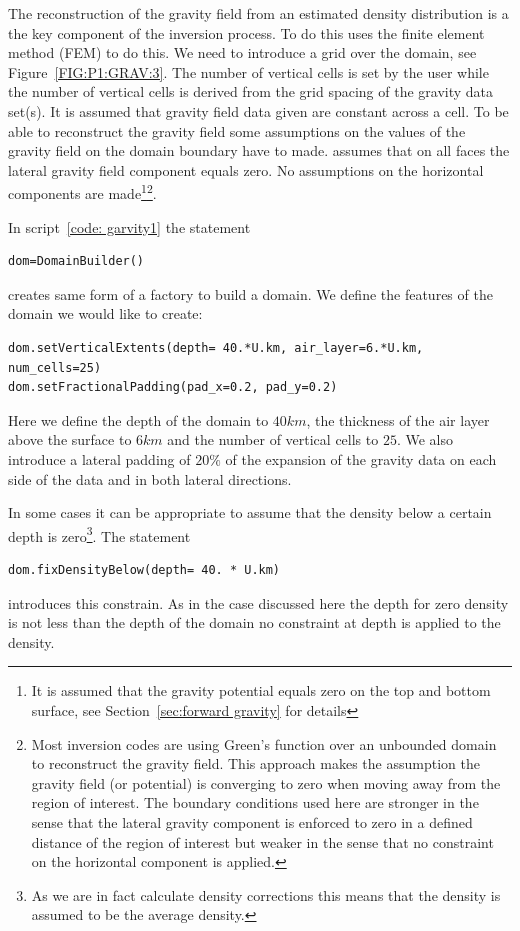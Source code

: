 The reconstruction of the gravity field from an estimated density distribution is a the key component of the inversion process.
To do this \downunder uses the finite element method (FEM) to do this. We need to introduce a grid over the domain, see Figure~\ref{FIG:P1:GRAV:3}.
The number of vertical cells is set by the user while the number of vertical cells is derived from the grid spacing of the 
gravity data set(s). It is assumed that gravity field data given are constant across a cell. 
To be able to reconstruct the gravity field some assumptions on the values of the gravity field on the domain boundary
have to made. \downunder assumes that on all faces the lateral gravity field component equals 
zero. No assumptions on the 
horizontal components are made\footnote{It is assumed that the gravity potential equals zero on the top and bottom
surface, see Section~\ref{sec:forward gravity} for details}\footnote{Most inversion codes are using Green's function over an unbounded domain to reconstruct the gravity field. This approach
makes the assumption the gravity field (or potential) is converging to zero when moving away from the region of interest. The 
boundary conditions used here are stronger in the sense that the lateral gravity component is enforced to zero in 
a defined distance of the region of interest but weaker in the sense that no constraint on the horizontal component is applied.}.
   
In script~\ref{code: garvity1} the statement
\begin{verbatim}
dom=DomainBuilder()
\end{verbatim}
creates same form of a factory to build a domain. 
We define the features of the domain we would like to create:
\begin{verbatim}
dom.setVerticalExtents(depth= 40.*U.km, air_layer=6.*U.km, num_cells=25)
dom.setFractionalPadding(pad_x=0.2, pad_y=0.2)
\end{verbatim}
Here we define the depth of the domain to $40 km$, the thickness of the air layer above the surface to $6km$ and 
the number of vertical cells to $25$. We also introduce a lateral padding of $20 \%$ of the expansion of
the gravity data on each side of the data and in both lateral directions.

In some cases it can be appropriate to assume that the density below a certain depth is 
zero\footnote{As we are in fact calculate density corrections this means that the density is assumed to be
the average density.}. The statement 
\begin{verbatim}
dom.fixDensityBelow(depth= 40. * U.km)
\end{verbatim}
introduces this constrain. As in the case discussed here the depth for zero density is not less than the
depth of the domain no constraint at depth is applied to the density.


